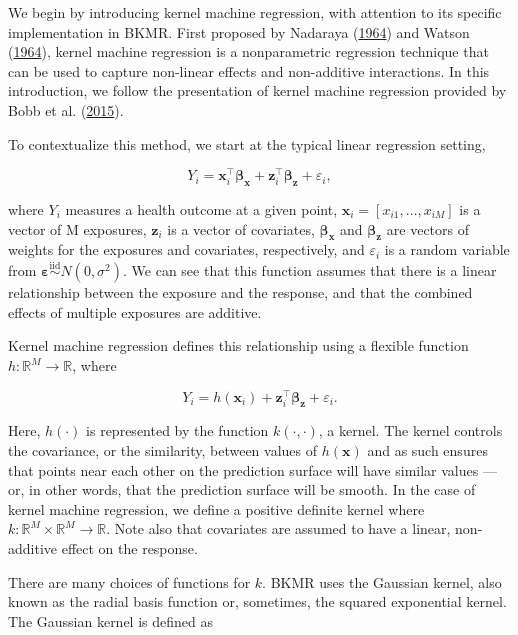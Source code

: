 \documentclass[12pt, twoside]{amherstthesis}
\begin{document}
We begin by introducing kernel machine regression, with attention to its specific implementation in BKMR. First proposed by Nadaraya (\protect\hyperlink{ref-nadaraya_estimating_1964}{1964}) and Watson (\protect\hyperlink{ref-watson_smooth_1964}{1964}), kernel machine regression is a nonparametric regression technique that can be used to capture non-linear effects and non-additive interactions. In this introduction, we follow the presentation of kernel machine regression provided by Bobb et al. (\protect\hyperlink{ref-bobb_bayesian_2015}{2015}).

To contextualize this method, we start at the typical linear regression setting,

\[
Y_i = \textbf{x}_i^\top \boldsymbol{\beta}_{\textbf{x}} + \textbf{z}_i^\top \boldsymbol{\beta}_{\textbf{z}} + \varepsilon_i,
\]

\noindent where \(Y_i\) measures a health outcome at a given point, \(\textbf{x}_i = [x_{i1},\dots,x_{iM}]\) is a vector of M exposures, \(\textbf{z}_i\) is a vector of covariates, \(\boldsymbol{\beta}_{\textbf{x}}\) and \(\boldsymbol{\beta}_{\textbf{z}}\) are vectors of weights for the exposures and covariates, respectively, and \(\varepsilon_i\) is a random variable from \(\boldsymbol\varepsilon \overset{\mathrm{iid}}{\sim} N(0, \sigma^2)\). We can see that this function assumes that there is a linear relationship between the exposure and the response, and that the combined effects of multiple exposures are additive.

Kernel machine regression defines this relationship using a flexible function \(h: \mathbb{R}^M \rightarrow \mathbb{R}\), where

\[
Y_i = h(\textbf{x}_i) + \textbf{z}_i^\top \boldsymbol{\beta}_{\textbf{z}} + \varepsilon_i.
\]

\noindent Here, \(h(\cdot)\) is represented by the function \(k(\cdot, \cdot)\), a kernel. The kernel controls the covariance, or the similarity, between values of \(h(\textbf{x})\) and as such ensures that points near each other on the prediction surface will have similar values --- or, in other words, that the prediction surface will be smooth. In the case of kernel machine regression, we define a positive definite kernel where \(k: \mathbb{R}^M\times \mathbb{R}^M \rightarrow \mathbb{R}\). Note also that covariates are assumed to have a linear, non-additive effect on the response.

There are many choices of functions for \(k\). BKMR uses the Gaussian kernel, also known as the radial basis function or, sometimes, the squared exponential kernel. The Gaussian kernel is defined as
\end{document}
